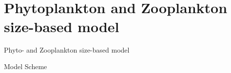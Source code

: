 \documentclass{beamer}
\begin{document}
\section{Phytoplankton and Zooplankton size-based model}
\begin{frame}{Phyto- and Zooplankton size-based model}

\begin{center}
Model Scheme
\end{center}


\end{frame}
\end{document}
